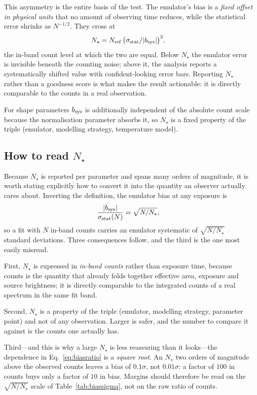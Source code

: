 \documentclass[11pt,a4paper]{article}
\begin{document}
This asymmetry is the entire basis of the test. The emulator's bias is a
\emph{fixed offset in physical units} that no amount of observing time reduces,
while the statistical error shrinks as $N^{-1/2}$. They cross at
\begin{equation}
N_\star = N_{\rm ref}\,\big(\sigma_{\rm stat}/|b_{\rm sys}|\big)^2 ,
\end{equation}
the in-band count level at which the two are equal. Below $N_\star$ the emulator
error is invisible beneath the counting noise; above it, the analysis reports a
systematically shifted value with confident-looking error bars. Reporting
$N_\star$ rather than a goodness score is what makes the result actionable: it
is directly comparable to the counts in a real observation.

For shape parameters $b_{\rm sys}$ is additionally independent of the absolute
count scale because the normalisation parameter absorbs it, so $N_\star$ is a
fixed property of the triple (emulator, modelling strategy, temperature model).

\subsection{How to read $N_\star$}\label{sec:readnstar}
Because $N_\star$ is reported per parameter and spans many orders of magnitude,
it is worth stating explicitly how to convert it into the quantity an observer
actually cares about. Inverting the definition, the emulator bias at any
exposure is
\begin{equation}
\frac{|b_{\rm sys}|}{\sigma_{\rm stat}(N)} = \sqrt{N/N_\star},
\label{eq:biasratio}
\end{equation}
so a fit with $N$ in-band counts carries an emulator systematic of
$\sqrt{N/N_\star}$ standard deviations. Three consequences follow, and the
third is the one most easily misread.

First, $N_\star$ is expressed in \emph{in-band counts} rather than exposure
time, because counts is the quantity that already folds together effective
area, exposure and source brightness; it is directly comparable to the
integrated counts of a real spectrum in the same fit band.

Second, $N_\star$ is a property of the triple (emulator, modelling strategy,
parameter point) and not of any observation. Larger is safer, and the number
to compare it against is the counts one actually has.

Third---and this is why a large $N_\star$ is less reassuring than it looks---the
dependence in Eq.~\eqref{eq:biasratio} is a \emph{square root}. An $N_\star$ two
orders of magnitude above the observed counts leaves a bias of $0.1\sigma$, not
$0.01\sigma$: a factor of $100$ in counts buys only a factor of $10$ in bias.
Margins should therefore be read on the $\sqrt{N/N_\star}$ scale of
Table~\ref{tab:biassigma}, not on the raw ratio of counts.
\end{document}
